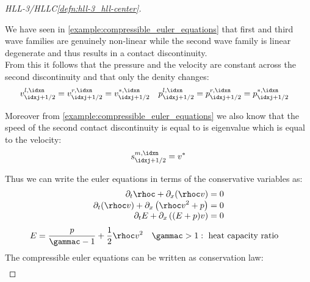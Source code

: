 \begin{proofbox}\nospacing
    \begin{proof}[HLL-3/HLLC\cref{defn:hll-3_hll-center}]\label{proof:defn:hll-3_hll-center}\leavevmode\\
        \begin{circlelistnosep}
            \item We have seen in \cref{example:compressible_euler_equations} that first and third wave families are genuinely non-linear while
            the second wave family is linear degenerate and thus results in a contact discontinuity.\\
            From this it follows that the pressure and the velocity are constant across the second discontinuity and that only the denity changes:
            \begin{align*}
              v_{\idxj+1/2}^{l,\idxn}=v_{\idxj+1/2}^{r,\idxn}=v_{\idxj+1/2}^{*,\idxn}&&
              p_{\idxj+1/2}^{l,\idxn}=p_{\idxj+1/2}^{r,\idxn}=p_{\idxj+1/2}^{*,\idxn}&&
            \end{align*}
            \item Moreover from \cref{example:compressible_euler_equations} we also know that the speed of the second
            contact discontinuity is equal to is eigenvalue which is equal to the velocity:
           \begin{align*}
             s_{\idxj+1/2}^{m,\idxn}=v^{*}
           \end{align*}
        \end{circlelistnosep}
        Thus we can write the euler equations in terms of the conservative variables as:
        \begin{align}
          \begin{aligned}
          \partial_{t}\rhoc+\partial_{x}(\rhoc v)&=0 \\[-1\jot]
          \partial_{t}(\rhoc v)+\partial_{x}\left(\rhoc v^{2}+p\right)&=0 \\[-1\jot]
          \partial_{t}E+\partial_{x}\left((E+p)v\right)&=0
          \end{aligned}\label{eq:proof_euler_hll3}
        \end{align}
        \begin{align}
          &E=\frac{p}{\gammac-1}+\frac{1}{2}\rhoc v^{2}&&\gammac>1: \text{ heat capacity ratio}
        \end{align}
        The compressible euler equations can be written as conservation law:
        \begin{align*}

\end{align*}
\end{proof}
\end{proofbox}
